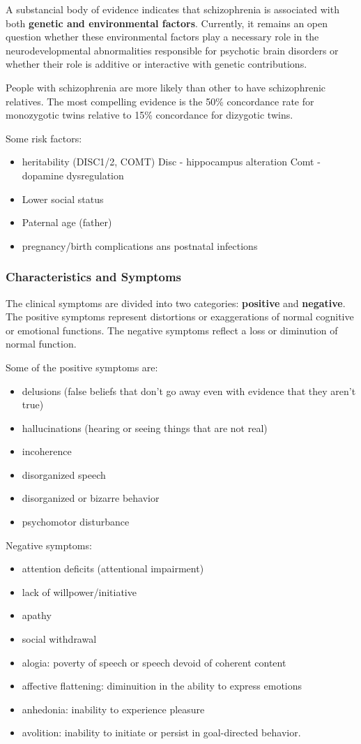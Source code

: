 \documentclass[12pt,article,oneside,a4paper]{memoir}
\begin{document}
A substancial body of evidence indicates that schizophrenia is associated with
both \textbf{genetic and environmental factors}. Currently, it remains an open 
question whether these environmental factors play a necessary role in the
neurodevelopmental abnormalities responsible for psychotic brain disorders or 
whether their role is additive or interactive with genetic contributions.

People with schizophrenia are more likely than other to have schizophrenic 
relatives. The most compelling evidence is the 50\% concordance rate for
monozygotic twins relative to 15\% concordance for dizygotic twins.

Some risk factors:
\begin{itemize}
\item heritability (DISC1/2, COMT)
\subitem Disc - hippocampus alteration
\subitem Comt - dopamine dysregulation
\item Lower social status
\item Paternal age (father)
\item pregnancy/birth complications ans postnatal infections
\end{itemize}

\subsubsection{Characteristics and Symptoms}

The clinical symptoms are divided into two categories: \textbf{positive} and
\textbf{negative}. The positive symptoms represent distortions or exaggerations
of normal cognitive or emotional functions. The negative symptoms reflect a
loss or diminution of normal function.

Some of the positive symptoms are:
\begin{itemize}
\item delusions (false beliefs that don't go away even with evidence that they
aren't true)
\item hallucinations (hearing or seeing things that are not real)
\item incoherence
\item disorganized speech
\item disorganized or bizarre behavior
\item psychomotor disturbance
\end{itemize}

Negative symptoms:
\begin{itemize}
\item attention deficits (attentional impairment)
\item lack of willpower/initiative
\item apathy
\item social withdrawal
\item alogia: poverty of speech or speech devoid of coherent content
\item affective flattening: diminuition in the ability to express emotions
\item anhedonia: inability to experience pleasure
\item avolition: inability to initiate or persist in goal-directed behavior.
\end{itemize}
\end{document}
